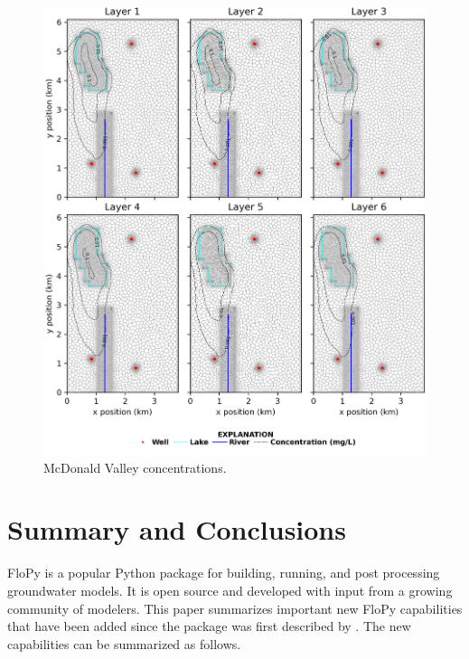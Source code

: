 \documentclass[11pt, oneside]{article}  	%
\begin{document}
\begin{figure}[ht!]
	\begin{center}
		\includegraphics{figures/mv_voronoi_map_concentration.png}
	\end{center}
	\caption{McDonald Valley concentrations.}
	\label{fig:mvxsection}
\end{figure}


\section{Summary and Conclusions}
FloPy is a popular Python package for building, running, and post processing groundwater models. It is open source and developed with input from a growing community of modelers. This paper summarizes important new FloPy capabilities that have been added since the package was first described by \citep{bakker2016scripting}. The new capabilities can be summarized as follows.
\end{document}
